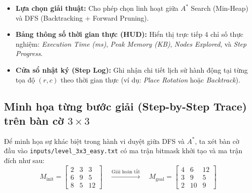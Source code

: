 \documentclass[a4paper]{article}
\begin{document}
\begin{enumerate}
\begin{itemize}
        \item \textbf{Lựa chọn giải thuật:} Cho phép chọn linh hoạt giữa $A^*$ Search (Min-Heap) và DFS (Backtracking + Forward Pruning).
        \item \textbf{Bảng thông số thời gian thực (HUD):} Hiển thị trực tiếp 4 chỉ số thực nghiệm: \textit{Execution Time (ms)}, \textit{Peak Memory (KB)}, \textit{Nodes Explored}, và \textit{Step Progress}.
        \item \textbf{Cửa sổ nhật ký (Step Log):} Ghi nhận chi tiết lịch sử hành động tại từng tọa độ $(r, c)$ theo thời gian thực (ví dụ: \textit{Place Rotation} hoặc \textit{Backtrack}).
    \end{itemize}
\end{enumerate}

\subsection{Minh họa từng bước giải (Step-by-Step Trace) trên bàn cờ \texorpdfstring{$3 \times 3$}{3x3}}
Để minh họa sự khác biệt trong hành vi duyệt giữa DFS và $A^*$, ta xét bàn cờ đầu vào \texttt{inputs/level\_3x3\_easy.txt} có ma trận bitmask khởi tạo và ma trận đích như sau:
\begin{equation*}
    M_{\text{init}} = \begin{bmatrix}
    2 & 3 & 3 \\
    6 & 9 & 5 \\
    8 & 5 & 12
    \end{bmatrix}
    \quad \xrightarrow{\text{Giải hoàn tất}} \quad
    M_{\text{goal}} = \begin{bmatrix}
    4 & 6 & 12 \\
    3 & 9 & 5 \\
    2 & 10 & 9
    \end{bmatrix}
\end{equation*}
\end{document}
